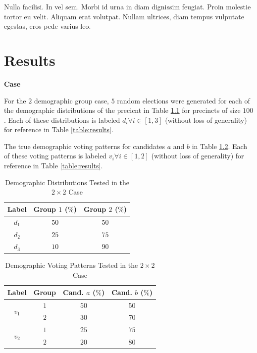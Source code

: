 \begin{savequote}[75mm]
Nulla facilisi. In vel sem. Morbi id urna in diam dignissim feugiat. Proin molestie tortor eu velit. Aliquam erat volutpat. Nullam ultrices, diam tempus vulputate egestas, eros pede varius leo.
\end{savequote}

\chapter{Results}


 \textbf{Case}

For the $2$ demographic group case, $5$ random elections were generated for each of the demographic distributions of the precicnt in Table \ref{table:demo_dist} for precincts of size $100$. Each of these distributions is labeled $d_i \forall i \in [1, 3]$ (without loss of generality) for reference in Table \ref{table:results}.

The true demographic voting patterns for candidates $a$ and $b$ in Table \ref{table:voting}. Each of these voting patterns is labeled $v_i \forall i \in [1, 2]$ (without loss of generality) for reference in Table \ref{table:results}.

\begin{table}[ht]
 \centering
 \caption{Demographic Distributions Tested in the $2 \times 2$ Case}
 \label{table:demo_dist}
 \begin{tabular}{|c|c|c|}
   \hline
   Label & Group $1$ ($\%$) & Group $2$ ($\%$) \\
   \hline
   $d_1$ & $50$ & $50$ \\
   $d_2$ & $25$ & $75$ \\
   $d_3$ & $10$ & $90$ \\
  \hline
 \end{tabular}
\end{table}

\begin{table}[ht]
 \centering
 \caption{Demographic Voting Patterns Tested in the $2 \times 2$ Case}
 \label{table:voting}
 \begin{tabular}{|c|c|c|c|}
   \hline
   Label & Group & Cand. $a$ ($\%$) & Cand. $b$ ($\%$) \\
   \hline
   \multirow{2}{*}{$v_1$} & $1$ & $50$ & $50$ \\
   & $2$ & $30$ & $70$ \\
   \hline
   \multirow{2}{*}{$v_2$} & $1$ & $25$ & $75$ \\
   & $2$ & $20$ & $80$ \\
  \hline
 \end{tabular}
\end{table}

